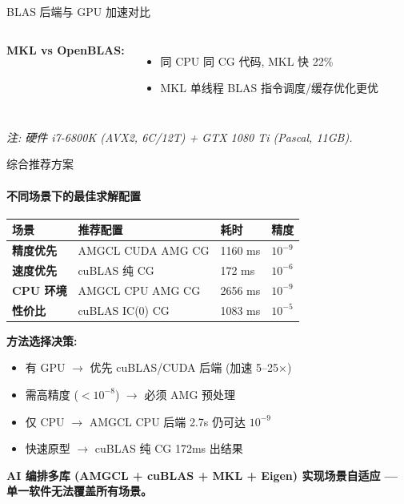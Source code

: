 \documentclass[12pt,aspectratio=169]{beamer}
\begin{document}
\begin{frame}[shrink]{BLAS 后端与 GPU 加速对比}
\begin{columns}[T]
\vspace{6pt}
\textbf{MKL vs OpenBLAS:}
\begin{itemize}\itemsep0pt\footnotesize
  \item 同 CPU 同 CG 代码, MKL 快 22\%
  \item MKL 单线程 BLAS 指令调度/缓存优化更优
\end{itemize}
\end{columns}

\vspace{2pt}
\footnotesize
\emph{注: 硬件 i7-6800K (AVX2, 6C/12T) + GTX 1080 Ti (Pascal, 11GB).}
\end{frame}

\begin{frame}[shrink]{综合推荐方案}
\framesubtitle{不同场景下的最佳求解配置}

\footnotesize
\begin{center}
\renewcommand{\arraystretch}{1.2}
\setlength{\tabcolsep}{5pt}
\begin{tabular}{@{}l l l l@{}}
\toprule
\textbf{场景} & \textbf{推荐配置} & \textbf{耗时} & \textbf{精度} \\
\midrule
\textbf{精度优先} & AMGCL CUDA AMG CG  & 1160 ms & \textbf{$10^{-9}$} \\
\textbf{速度优先} & cuBLAS 纯 CG       & 172 ms  & $10^{-6}$ \\
\textbf{CPU 环境} & AMGCL CPU AMG CG   & 2656 ms & $10^{-9}$ \\
\textbf{性价比}   & cuBLAS IC(0) CG    & 1083 ms & $10^{-5}$ \\
\bottomrule
\end{tabular}
\end{center}
\normalsize

\vspace{4pt}
\small
\textbf{方法选择决策:}
\begin{itemize}\itemsep1pt
  \item 有 GPU $\to$ 优先 cuBLAS/CUDA 后端 (加速 5--25$\times$)
  \item 需高精度 ($<10^{-8}$) $\to$ 必须 AMG 预处理
  \item 仅 CPU $\to$ AMGCL CPU 后端 2.7s 仍可达 $10^{-9}$
  \item 快速原型 $\to$ cuBLAS 纯 CG 172ms 出结果
\end{itemize}

\vspace{4pt}
\begin{center}
\small \textbf{AI 编排多库 (AMGCL + cuBLAS + MKL + Eigen) 实现场景自适应 — 单一软件无法覆盖所有场景。}
\end{center}
\end{frame}
\end{document}
